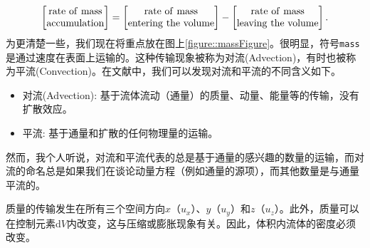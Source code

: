 \documentclass[MathematicsNumericsDerivationsAndOpenFOAM.tex]{subfiles}
\begin{document}
%
%
\begin{equation}
\left[
 \begin{matrix}
  \mathrm{rate~of~mass}\\
  \mathrm{accumulation}
 \end{matrix}
\right]
=
\left[
 \begin{matrix}
  \mathrm{rate~of~mass}\\
  \mathrm{entering~the~volume}
 \end{matrix}
\right]
-
\left[
 \begin{matrix}
  \mathrm{rate~of~mass}\\
  \mathrm{leaving~the~volume}
 \end{matrix}
\right].
\label{equation::massWord}
\end{equation}
%
%
	为更清楚一些，我们现在将重点放在图上\ref{figure::massFigure}。很明显，符号{\texttt{mass}}是通过速度在表面上运输的。这种传输现象被称为对流(Advection)，有时也被称为平流(Convection)。在文献中，我们可以发现对流和平流的不同含义如下。
%
%
\begin{itemize}
 \item 对流(Advection): 基于流体流动（通量）的质量、动量、能量等的传输，没有扩散效应。
  \item 平流: 基于通量和扩散的任何物理量的运输。
\end{itemize}
%
%
    然而，我个人听说，对流和平流代表的总是基于通量的感兴趣的数量的运输，而对流的命名总是如果我们在谈论动量方程（例如通量的源项），而其他数量是与通量平流的。


	质量的传输发生在所有三个空间方向$x$（$u_x$）、$y$（$u_y$）和$z$（$u_z$）。此外，质量可以在控制元素d$V$内改变，这与压缩或膨胀现象有关。因此，体积内流体的密度必须改变。
\end{document}
